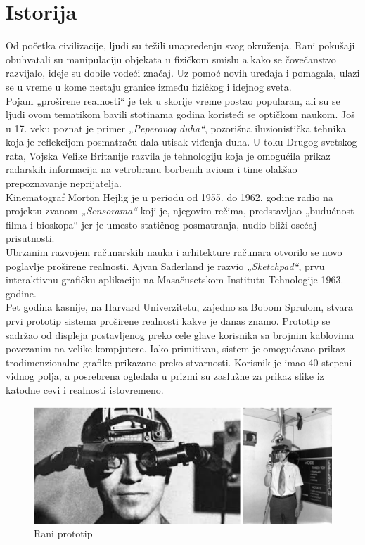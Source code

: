 \documentclass[a4paper]{article}
\begin{document}
	\section{Istorija}
    \label{sec:Istorija}
    Od početka civilizacije, ljudi su težili unapređenju svog okruženja. Rani pokušaji obuhvatali su manipulaciju objekata u fizičkom smislu a kako se čovečanstvo razvijalo,
	 ideje su dobile vodeći značaj. Uz pomoć novih uređaja i pomagala, ulazi se u vreme u kome nestaju granice između fizičkog i idejnog sveta.\\
    Pojam „proširene realnosti“ je tek u skorije vreme postao popularan, ali su se ljudi ovom tematikom bavili stotinama godina koristeći se optičkom naukom. Još u 17. veku poznat
	 je primer \emph{„Peperovog duha“}, pozorišna iluzionistička tehnika koja je reflekcijom posmatraču dala utisak viđenja duha. U toku Drugog svetskog rata, Vojska Velike Britanije razvila 
	 je tehnologiju koja je omogućila prikaz radarskih informacija na vetrobranu borbenih aviona i time olakšao prepoznavanje neprijatelja.\\
    Kinematograf Morton Hejlig je u periodu od 1955. do 1962. godine radio na projektu zvanom \emph{„Sensorama“} koji je, njegovim rečima, predstavljao „budućnost filma i bioskopa“ jer je 
	umesto statičnog posmatranja, nudio bliži osećaj prisutnosti.\\
    Ubrzanim razvojem računarskih nauka i arhitekture računara otvorilo se novo poglavlje proširene realnosti. Ajvan Saderland je razvio \emph{„Sketchpad“}, prvu interaktivnu grafičku aplikaciju
	 na Masačusetskom Institutu Tehnologije 1963. godine.\\
    Pet godina kasnije, na Harvard Univerzitetu, zajedno sa Bobom Sprulom, stvara prvi prototip sistema proširene realnosti kakve je danas znamo. 
	Prototip se sadržao od displeja postavljenog preko cele glave korisnika sa brojnim kablovima povezanim na velike kompjutere. Iako primitivan, sistem je omogućavao prikaz
	 trodimenzionalne grafike prikazane preko stvarnosti. Korisnik je imao 40 stepeni vidnog polja, a posrebrena ogledala u prizmi su zaslužne za prikaz slike iz katodne cevi i realnosti istovremeno.\\	\begin{figure}
	\begin{center}
		\includegraphics[scale=0.5]{raniprototip_harvard.png}
		\end{center}
		\caption{Rani prototip}
		\label{fig:Rani prototip}
	\end{figure}
\end{document}
